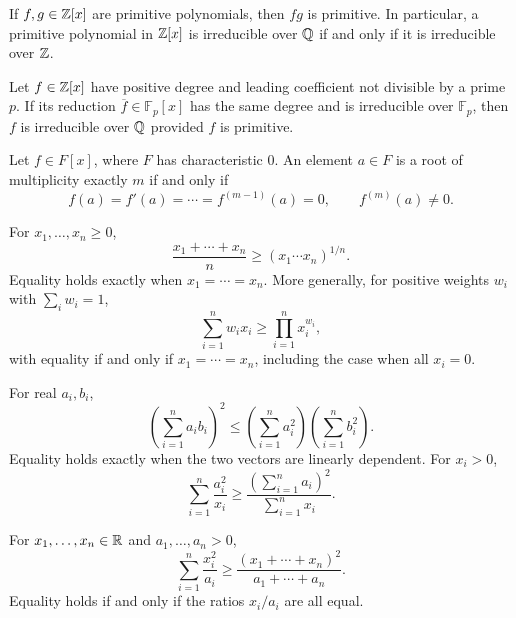 \begin{theorem}
If $f, g\in\mathbb{Z}[x]$ are primitive polynomials, then $fg$ is primitive. In particular, a primitive polynomial in $\mathbb{Z}[x]$ is irreducible over $\mathbb{Q}$ if and only if it is irreducible over $\mathbb{Z}$.
\end{theorem}

\begin{theorem}
Let $f\in\mathbb{Z}[x]$ have positive degree and leading coefficient not divisible by a prime $p$. If its reduction $\overline f\in\mathbb{F}_p[x]$ has the same degree and is irreducible over $\mathbb{F}_p$, then $f$ is irreducible over $\mathbb{Q}$ provided $f$ is primitive.
\end{theorem}

\begin{proposition}
Let $f\in F[x]$, where $F$ has characteristic $0$. An element $a\in F$ is a root of multiplicity exactly $m$ if and only if
\[
 f(a)=f'(a)=\cdots=f^{(m-1)}(a)=0,
 \qquad f^{(m)}(a)\ne0.
\]
\end{proposition}

\begin{theorem}
For $x_1, \dots, x_n\ge0$,
\[
 \frac{x_1+\cdots+x_n}{n}\ge (x_1\cdots x_n)^{1/n}.
\]
Equality holds exactly when $x_1=\cdots=x_n$. More generally, for positive weights $w_i$ with $\sum_iw_i=1$,
\[
 \sum_{i=1}^n w_ix_i\ge\prod_{i=1}^n x_i^{w_i},
\]
with equality if and only if $x_1=\cdots=x_n$, including the case when all $x_i=0$.
\end{theorem}

\begin{theorem}
For real $a_i, b_i$,
\[
 \left(\sum_{i=1}^n a_ib_i\right)^2
 \le \left(\sum_{i=1}^n a_i^2\right)
       \left(\sum_{i=1}^n b_i^2\right).
\]
Equality holds exactly when the two vectors are linearly dependent. For $x_i>0$,
\[
 \sum_{i=1}^n\frac{a_i^2}{x_i}
 \ge\frac{(\sum_{i=1}^n a_i)^2}{\sum_{i=1}^n x_i}.
\]
\end{theorem}


\begin{theorem}
For $x_1, \dots, x_n\in\mathbb{R}$ and $a_1, \dots, a_n>0$,
\[
 \sum_{i=1}^n\frac{x_i^2}{a_i}\ge
 \frac{(x_1+\cdots+x_n)^2}{a_1+\cdots+a_n}.
\]
Equality holds if and only if the ratios $x_i/a_i$ are all equal.
\end{theorem}


